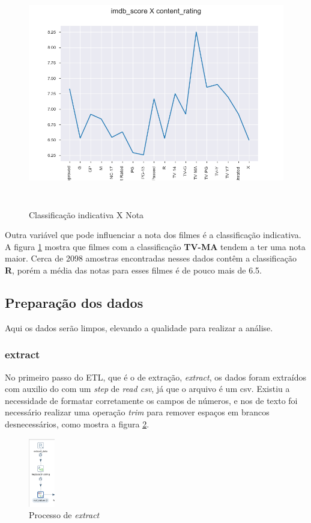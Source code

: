 \begin{figure}[H]
\centering
\includegraphics[height=10cm]{imagens/scoreXcontent.png}
\caption{Classificação indicativa X Nota}
\label{ratingXscore}
\end{figure}
Outra variável que pode influenciar a nota dos filmes é a classificação indicativa. A figura \ref{ratingXscore} mostra que filmes com a classificação \textbf{TV-MA} tendem a ter uma nota maior. Cerca de 2098 amostras encontradas nesses dados contêm a classificação \textbf{R}, porém a média das notas para esses filmes é de pouco mais de 6.5.

\subsection{Preparação dos dados}
Aqui os dados serão limpos, elevando a qualidade para realizar a análise.

\subsubsection{extract}
No primeiro passo do ETL, que é o de extração, \textit{extract}, os dados foram extraídos com auxilio do \pdi com um \textit{step} de \textit{read csv}, já que o arquivo é um csv. Existiu a necessidade de formatar corretamente os campos de números, e nos de texto foi necessário realizar uma operação \textit{trim} para remover espaços em brancos desnecessários, como mostra a figura \ref{extractProcess}. 

\begin{figure}[H]
\centering
\includegraphics[height=3cm]{imagens/primeiro_tratamento.png}
\caption{Processo de \textit{extract}}
\label{extractProcess}
\end{figure}

